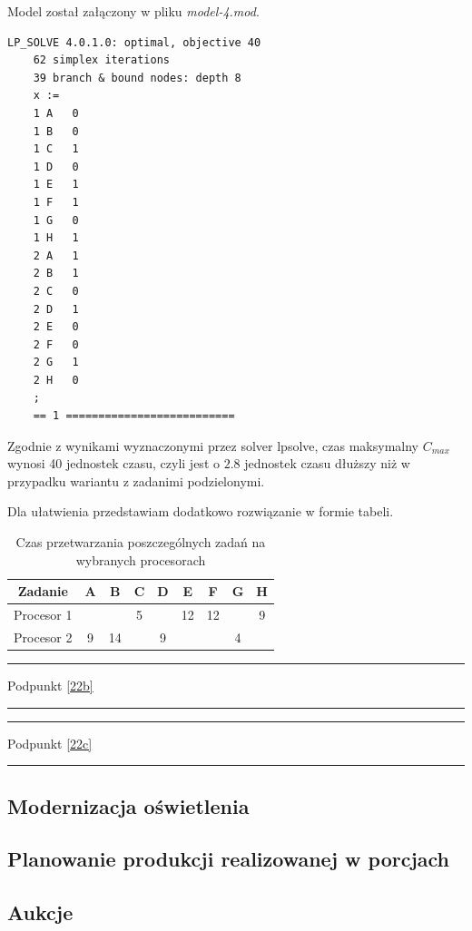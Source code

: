 \documentclass[
    12pt, %
]{../fphw}
\begin{document}
\newpage


Model został załączony w pliku \textit{model-4.mod}.


\begin{lstlisting}[caption=Rozwiązanie znalezione solwerem lpsolve]
    LP_SOLVE 4.0.1.0: optimal, objective 40
    62 simplex iterations
    39 branch & bound nodes: depth 8
    x :=
    1 A   0
    1 B   0
    1 C   1
    1 D   0
    1 E   1
    1 F   1
    1 G   0
    1 H   1
    2 A   1
    2 B   1
    2 C   0
    2 D   1
    2 E   0
    2 F   0
    2 G   1
    2 H   0
    ;
    == 1 ==========================  
\end{lstlisting}

Zgodnie z wynikami wyznaczonymi przez solver lpsolve, czas maksymalny \(C_{max}\) wynosi 40 jednostek czasu,
czyli jest o \(2.8\) jednostek czasu dłuższy niż w przypadku wariantu z zadanimi podzielonymi.

Dla ułatwienia przedstawiam dodatkowo rozwiązanie w formie tabeli.
\begin{table}[H]
    \centering
    \begin{tabular}{| c | c | c | c | c | c | c | c | c |}
        \hline
        Zadanie    & A & B    & C & D & E  & F  & G & H \\
        \hline
        Procesor 1 &   &  & 5 &   &  12  & 12 &   & 9 \\
        \hline
        Procesor 2 & 9 & 14  &   & 9 &  &    & 4 &   \\
        \hline
    \end{tabular}
    \caption{Czas przetwarzania poszczególnych zadań na wybranych procesorach}
\end{table}

\newpage

\par\noindent\rule{\textwidth}{0.4pt}
Podpunkt \ref{22b}
\par\noindent\rule{\textwidth}{0.4pt}

\par\noindent\rule{\textwidth}{0.4pt}
Podpunkt \ref{22c}
\par\noindent\rule{\textwidth}{0.4pt}

\subsection{Modernizacja oświetlenia}
\subsection{Planowanie produkcji realizowanej w porcjach}
\subsection{Aukcje}
\end{document}
